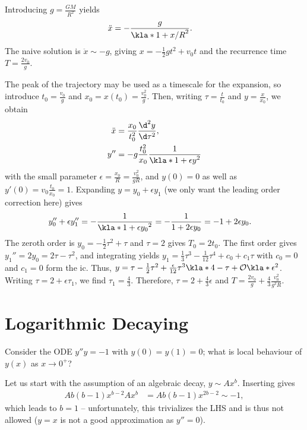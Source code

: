 \documentclass[english, parskip=full]{scrbook}
\newcommand{\example}[3]{\begin{tcolorbox}[colback=colorbackgroundexample,colframe=colorexample, breakable,enhanced,title={\textbf{#1}: #2.}]#3\end{tcolorbox}}
\begin{document}
\example{A projectile motion}{$\ddot{x} = -\frac{GM}{\kla*{x+R}^2}$ with $x(0)=0$, $\dot{x}(0)=v_0$ and $x(t)\ll R$}{Introducing $g = \frac{GM}{R^2}$ yields
\begin{align}
\ddot{x} &= -\frac{g}{\kla*{1+x/R}^2}.
\end{align}
The naive solution is $\ddot{x} \sim -g$, giving $x=-\frac{1}{2}gt^2 + v_0t$ and the recurrence time $T=\frac{2v_0}{g}$.

The peak of the trajectory may be used as a timescale for the expansion, so introduce $t_0=\frac{v_0}{g}$ and $x_0=x(t_0) = \frac{v_0^2}{g}$.
Then, writing $\tau=\frac{t}{t_0}$ and $y = \frac{x}{x_0}$, we obtain
\begin{align}
\ddot{x} &= \frac{x_0}{t_0^2} \frac{\d^2 y}{\d \tau^2},\\
y'' &= -g \frac{t_0^2}{x_0} \frac{1}{\kla*{1 + \epsilon y}^2}
\end{align}
with the small parameter $\epsilon = \frac{x_0}{R} = \frac{v_0^2}{gR}$, and $y(0)=0$ as well as $y'(0) = v_0 \frac{t_0}{x_0} = 1$.
Expanding $y=y_0+\epsilon y_1$ (we only want the leading order correction here) gives
\begin{align}
y_0'' + \epsilon y_1'' &= -\frac{1}{\kla*{1 + \epsilon y_0}^2} = -\frac{1}{1 + 2\epsilon y_0} = -1 + 2\epsilon y_0.
\end{align}
The zeroth order is $y_0=-\frac{1}{2}\tau^2 + \tau$ and $\tau=2$ gives $T_0= 2t_0$.
The first order gives $y_1'' = 2y_0 = 2\tau - \tau^2$, and integrating yields $y_1 = \frac{1}{3}\tau^3 - \frac{1}{12} \tau^4 + c_0 + c_1\tau$ with $c_0=0$ and $c_1=0$ form the \gls{ic}.
Thus, $y = \tau - \frac{1}{2}\tau^2 + \frac{\epsilon}{12} \tau^3 \kla*{4 - \tau} + \mathcal{O}\kla*{\epsilon^2}$.
Writing $\tau = 2 + \epsilon\tau_1$, we find $\tau_1 = \frac{4}{3}$.
Therefore, $\tau = 2 + \frac{4}{3}\epsilon$ and $T = \frac{2v_0}{g} + \frac{4}{3} \frac{v_0^2}{g^2R}$.
}

\section{Logarithmic Decaying}
Consider the ODE $y''y = -1$ with $y(0)=y(1)=0$; what is local behaviour of $y(x)$ as $x\rightarrow 0^+$?

Let us start with the assumption of an algebraic decay, $y\sim Ax^b$.
Inserting gives
\begin{align}
Ab(b-1)x^{b-2} Ax^b &= Ab(b-1) x^{2b-2} \sim -1,
\end{align}
which leads to $b=1$ -- unfortunately, this trivializes the LHS and is thus not allowed ($y=x$ is not a good approximation as $y''=0$).
\end{document}
